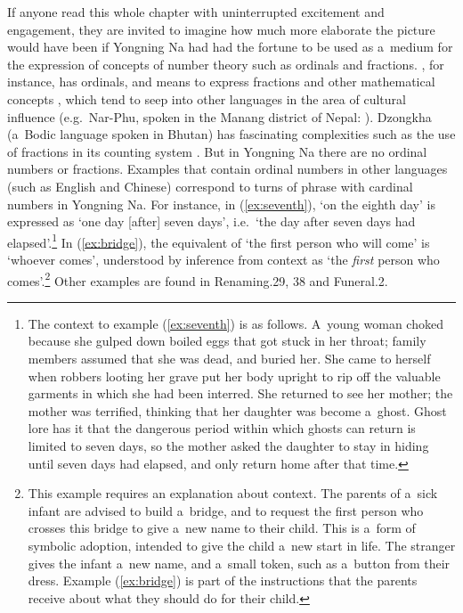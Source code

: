 
If anyone read this whole chapter with uninterrupted excitement and engagement, they are invited to imagine how much more elaborate the picture would have been if Yongning Na had had the fortune to be used as a~medium for the expression of concepts of number theory such as ordinals and fractions. , for instance, has ordinals, and means to express fractions and other mathematical concepts \citep{liu2010tib}, which tend to seep into other languages in the area of cultural  influence (e.g.~Nar-Phu, spoken in the Manang district of Nepal: \citealt[342]{noonan2003}). Dzongkha (a~Bodic language spoken in Bhutan) has fascinating complexities such as the use of fractions in its counting system \citep{mazaudon1985a}. But in Yongning Na there are no ordinal numbers or fractions. Examples that contain ordinal numbers in other languages (such as {English} and Chinese) correspond to turns of phrase with cardinal numbers in Yongning Na. For instance, in (\ref{ex:seventh}), ‘on the eighth day’ is expressed as ‘one day [after] seven days’, i.e.\ ‘the day after seven days had elapsed’.\footnote{The context to example (\ref{ex:seventh}) is as follows. A~young woman choked because she gulped down boiled eggs that got stuck in her throat; family members assumed that she was dead, and buried her. She came to herself when robbers looting her grave put her body upright to rip off the valuable garments in which she had been interred. She returned to see her mother; the mother was terrified, thinking that her daughter was become a~ghost. Ghost lore has it that the dangerous period within which ghosts can return is limited to seven days, so the mother asked the daughter to stay in hiding until seven days had elapsed, and only return home after that time.} In (\ref{ex:bridge}), the equivalent of ‘the first person who will come' is ‘whoever comes', understood by inference from context as ‘the \textit{first} person who comes'.\footnote{This example requires an explanation about context. The parents of a~sick infant are advised to build a~bridge, and to request the first person who crosses this bridge to give a~new name to their child. This is a~form of symbolic adoption, intended to give the child a~new start in life. The stranger gives the infant a~new name, and a~small token, such as a~button from their dress. Example (\ref{ex:bridge}) is part of the instructions that the parents receive about what they should do for their child.} Other examples are found in Renaming.29, 38 and Funeral.2. 

